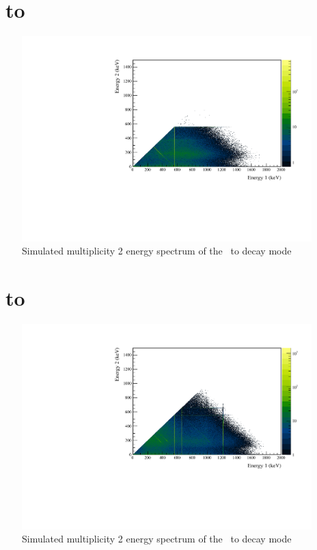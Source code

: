 \documentclass[/main.tex]{subfiles}
\begin{document}
\section{\tnbb\ to }
\begin{figure}[!htb]
  \centering
  \includegraphics[width=.8\linewidth]{ESsim_2vBB_ES2_1}
  \caption[Simulation of \tnbb\ to ]{
    Simulated multiplicity 2 energy spectrum of the \tnbb\ to  decay mode}
\end{figure}


\section{\tnbb\ to }
\begin{figure}[!htb]
  \centering
  \includegraphics[width=.8\linewidth]{ESsim_2vBB_ES2_2}
  \caption[Simulation of \tnbb\ to ]{
    Simulated multiplicity 2 energy spectrum of the \tnbb\ to  decay mode}
\end{figure}
\end{document}
